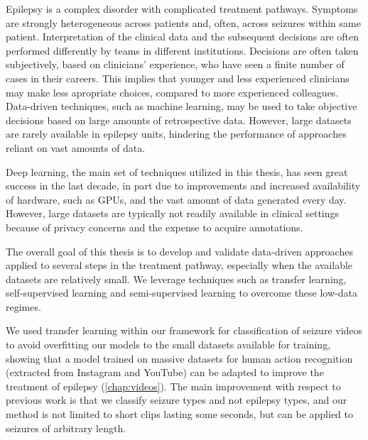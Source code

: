 Epilepsy is a complex disorder with complicated treatment pathways.
Symptoms are strongly heterogeneous across patients and, often, across seizures within same patient.
Interpretation of the clinical data and the subsequent decisions are often performed differently by teams in different institutions.
Decisions are often taken subjectively, based on clinicians' experience, who have seen a finite number of cases in their careers.
This implies that younger and less experienced clinicians may make less apropriate choices, compared to more experienced colleagues.
Data-driven techniques, such as machine learning, may be used to take objective decisions based on large amounts of retrospective data.
However, large datasets are rarely available in epilepsy units, hindering the performance of approaches reliant on vast amounts of data.

Deep learning, the main set of techniques utilized in this thesis, has seen great success in the last decade, in part due to improvements and increased availability of hardware, such as \acp{GPU}, and the vast amount of data generated every day.
However, large datasets are typically not readily available in clinical settings because of privacy concerns and the expense to acquire annotations.

The overall goal of this thesis is to develop and validate data-driven approaches applied to several steps in the treatment pathway, especially when the available datasets are relatively small.
We leverage techniques such as transfer learning, self-supervised learning and semi-supervised learning to overcome these low-data regimes.

We used transfer learning within our framework for classification of seizure videos to avoid overfitting our models to the small datasets available for training, showing that a model trained on massive datasets for human action recognition (extracted from Instagram and YouTube) can be adapted to improve the treatment of epilepsy (\cref{chap:videos}).
The main improvement with respect to previous work \cite{ahmedtaristizabal_automated_2017,cunha_neurokinect_2016,ahmedt-aristizabal_deep_2018,ahmedt-aristizabal_hierarchical_2018,maia_epileptic_2019,karacsony_deep_2020} is that we classify seizure types and not epilepsy types, and our method is not limited to short clips lasting some seconds, but can be applied to seizures of arbitrary length.

